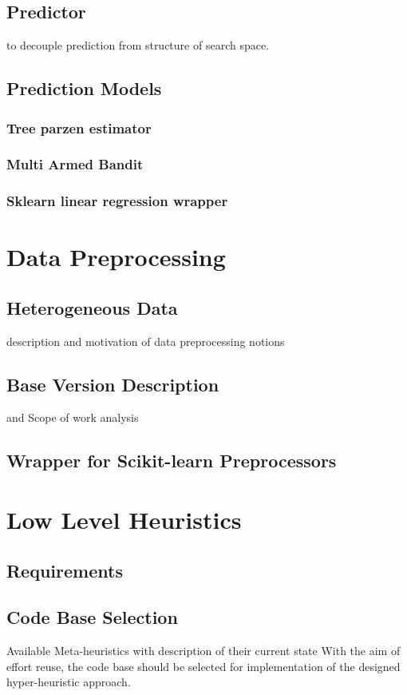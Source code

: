 \subsection{Predictor}
to decouple prediction from structure of search space.

\subsection{Prediction Models}
\subsubsection{Tree parzen estimator}
\subsubsection{Multi Armed Bandit}
\subsubsection{Sklearn linear regression wrapper}


\section{Data Preprocessing}
\subsection{Heterogeneous Data} description and motivation of data preprocessing notions

\subsection{Base Version Description} and Scope of work analysis
\subsection{Wrapper for Scikit-learn Preprocessors}


\section{Low Level Heuristics}\label{Impl: LLH}

\subsection{Requirements}

\subsection{Code Base Selection}\label{implementation:llh code basis selection}
Available Meta-heuristics with description of their current state
With the aim of effort reuse, the code base should be selected for implementation of the designed hyper-heuristic approach.
